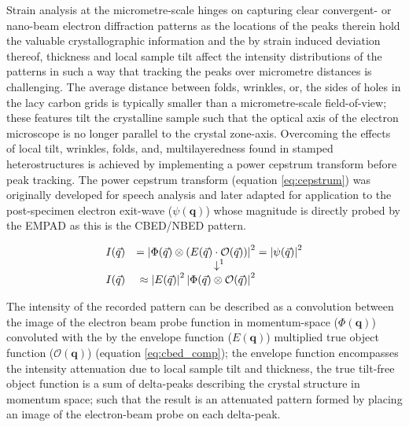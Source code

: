 Strain analysis at the micrometre-scale hinges on capturing clear convergent- or nano-beam electron diffraction patterns as the locations of the peaks therein hold the valuable crystallographic information and the by strain induced deviation thereof, thickness and local sample tilt affect the intensity distributions of the patterns in such a way that tracking the peaks over micrometre distances is challenging. %
%
The average distance between folds, wrinkles, or, the sides of holes in the lacy carbon grids is typically smaller than a micrometre-scale field-of-view; these features tilt the crystalline sample such that the optical axis of the electron microscope is no longer parallel to the crystal zone-axis. Overcoming the effects of local tilt, wrinkles, folds, and, multilayeredness found in stamped heterostructures is achieved by implementing a power cepstrum transform before peak tracking.
%
The power cepstrum transform (equation \ref{eq:cepstrum}) was originally developed for speech analysis \cite{1570854175999207936, oppenheimDspHistoryFrequency2004,nollCepstrumPitchDetermination1967} and later adapted for application to the post-specimen electron exit-wave ($\psi(\mathbf{q})$) whose magnitude is directly probed by the EMPAD \cite{padgettExitwavePowercepstrumTransform2020} as this is the CBED/NBED pattern.

\begin{alignat}{2}
	I(\vec{q}) &  & = \left| \Phi(\vec{q}) \otimes \left( E(\vec{q}) \cdot \mathcal{O}(\vec{q}) \right) \right|^2 & = \left| \psi(\vec{q}) \right|^2
	\label{eq:cbed_comp}                                                                                                                             \\
	\ArrowBetweenLines*[\downarrow^1\hspace{1cm}]%
	I(\vec{q}) &  & \approx \left|E(\vec{q}) \right|^2 \left|\Phi(\vec{q}) \otimes \mathcal{O}(\vec{q}) \right|^2 &
	\label{eq:cbed_approx}
\end{alignat}

The intensity of the recorded pattern can be described as a convolution between the image of the electron beam probe function in momentum-space ($\Phi(\mathbf{q})$) convoluted with the by the envelope function ($E(\mathbf{q})$) multiplied true object function ($\mathcal{O}(\mathbf{q})$) (equation \ref{eq:cbed_comp}); the envelope function encompasses the intensity attenuation due to local sample tilt and thickness, the true tilt-free object function is a sum of delta-peaks describing the crystal structure in momentum space; such that the result is an attenuated pattern formed by placing an image of the electron-beam probe on each delta-peak. 

